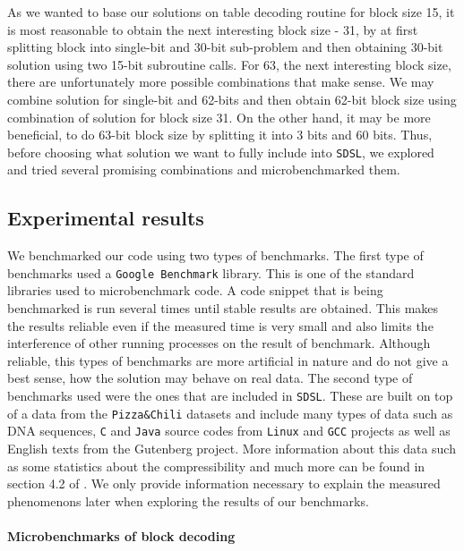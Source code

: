 As we wanted to base our solutions on table decoding routine for block size 15, it is most
reasonable to obtain the next interesting block size - 31, by at first splitting block into
single-bit and 30-bit sub-problem and then obtaining 30-bit solution using two 15-bit
subroutine calls. For 63, the next interesting block size, there are unfortunately more
possible combinations that make sense. We may combine solution for single-bit and 62-bits
and then obtain 62-bit block size using combination of solution for block size 31. On the
other hand, it may be more beneficial, to do 63-bit block size by splitting it into 3 bits
and 60 bits. Thus, before choosing what solution we want to fully include into \texttt{SDSL},
we explored and tried several promising combinations and microbenchmarked them.

\subsection{Experimental results}

We benchmarked our code using two types of benchmarks. The first type of benchmarks
used a \texttt{Google Benchmark} library. This is one of the standard libraries used to
microbenchmark code. A code snippet that is being benchmarked is run several times until
stable results are obtained. This makes the results reliable even if the measured time is
very small and also limits the interference of other running processes on the result of
benchmark. Although reliable, this types of benchmarks are more artificial in nature and
do not give a best sense, how the solution may behave on real data. The second type of
benchmarks used were the ones that are included in \texttt{SDSL}. These are built on top
of a data from the \texttt{Pizza\&Chili} datasets \citep{ferragina2005pizza} and include
many types of data such as DNA sequences, \texttt{C} and \texttt{Java} source codes from
\texttt{Linux} and \texttt{GCC} projects as well as English texts from the Gutenberg project.
More information about this data such as some statistics about the compressibility and much
more can be found in section 4.2 of \cite{ferragina2009compressed}. We only provide information
necessary to explain the measured phenomenons later when exploring the results of our benchmarks. 

\paragraph{Microbenchmarks of block decoding}

